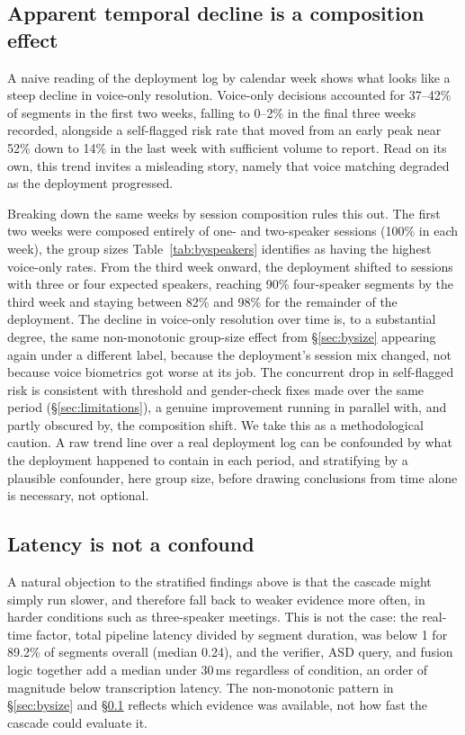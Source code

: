 \documentclass[conference,a4paper]{IEEEtran}
\begin{document}
\subsection{Apparent temporal decline is a composition effect}
\label{sec:bytime}

A naive reading of the deployment log by calendar week shows what
looks like a steep decline in voice-only resolution. Voice-only
decisions accounted for 37--42\% of segments in the first two weeks,
falling to 0--2\% in the final three weeks recorded, alongside a
self-flagged risk rate that moved from an early peak near 52\% down to
14\% in the last week with sufficient volume to report. Read on its own, this trend invites a misleading
story, namely that voice matching degraded as the deployment
progressed.

Breaking down the same weeks by session composition rules this out.
The first two weeks were composed entirely of one- and two-speaker
sessions (100\% in each week), the group sizes Table~\ref{tab:byspeakers}
identifies as having the highest voice-only rates. From the third week
onward, the deployment shifted to sessions with three or four expected
speakers, reaching 90\% four-speaker segments by the third week and
staying between 82\% and 98\% for the remainder of the deployment. The
decline in voice-only resolution over time is, to a substantial degree,
the same non-monotonic group-size effect from
\S\ref{sec:bysize} appearing again under a different label, because the
deployment's session mix changed, not because voice biometrics got
worse at its job. The concurrent drop in self-flagged risk is
consistent with threshold and gender-check fixes made over the same
period (\S\ref{sec:limitations}), a genuine improvement running in
parallel with, and partly obscured by, the composition shift. We take
this as a methodological caution. A raw trend line over a real
deployment log can be confounded by what the deployment happened to
contain in each period, and stratifying by a plausible confounder,
here group size, before drawing conclusions from time alone is
necessary, not optional.

\subsection{Latency is not a confound}

A natural objection to the stratified findings above is that the
cascade might simply run slower, and therefore fall back to weaker
evidence more often, in harder conditions such as three-speaker
meetings. This is not the case: the real-time factor, total pipeline
latency divided by segment duration, was below 1 for 89.2\% of segments
overall (median 0.24), and the verifier, ASD query, and fusion logic
together add a median under 30\,ms regardless of condition, an order
of magnitude below transcription latency. The non-monotonic pattern in
\S\ref{sec:bysize} and \S\ref{sec:bytime} reflects which evidence was
available, not how fast the cascade could evaluate it.
\end{document}
